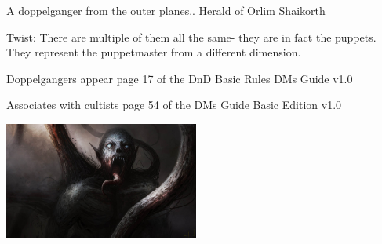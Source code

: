 \documentclass[a4paper]{dnd5}
\begin{document}
\begin{notes}
\item A doppelganger from the outer planes.. Herald of Orlim Shaikorth
\item Twist: There are multiple of them all the same- they are in fact the puppets.  They represent the puppetmaster from a different dimension.
\item Doppelgangers appear page 17 of the DnD Basic Rules DMs Guide v1.0
\item Associates with cultists page 54 of the DMs Guide Basic Edition v1.0
\end{notes}

\vspace{0.2in}
\includegraphics[width=0.48\textwidth]{puppetmaster.jpg}
\end{document}
